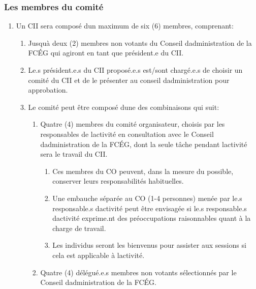 \subsubsection{Les membres du comité}
\label{les-membres-du-comite}

\begin{enumerate}
 \item
  Un CII sera composé d\textquotesingle un maximum de six (6) membres, comprenant:

  \begin{enumerate}
   \item
    Jusqu\textquotesingle à deux (2) membres non votants du Conseil d\textquotesingle administration de la FCÉG qui agiront en tant que président.e du CII.
   \item
    Le.s président.e.s du CII proposé.e.s est/sont chargé.e.s de choisir un comité du CII et de le présenter au conseil d\textquotesingle administration pour approbation.
   \item
    Le comité peut être composé d\textquotesingle une des combinaisons qui suit:

    \begin{enumerate}
     \item
      Quatre (4) membres du comité organisateur, choisis par les responsables de l\textquotesingle activité en consultation avec le Conseil d\textquotesingle administration de la FCÉG, dont la seule tâche pendant l\textquotesingle activité sera le travail du CII.
      \begin{enumerate}
       \item
        Ces membres du CO peuvent, dans la mesure du possible, conserver leurs responsabilités habituelles.
       \item
        Une embauche séparée au CO (1-4 personnes) menée par le.s responsable.s d\textquotesingle activité peut être envisagée si le.s responsable.s d\textquotesingle activité exprime.nt des préoccupations raisonnables quant à la charge de travail.
       \item
        Les individus seront les bienvenus pour assister aux sessions si cela est applicable à l\textquotesingle activité.
      \end{enumerate}

     \item
      Quatre (4) délégué.e.s membres non votants sélectionnés par le Conseil d\textquotesingle administration de la FCÉG.
    \end{enumerate}
  \end{enumerate}


\end{enumerate}

